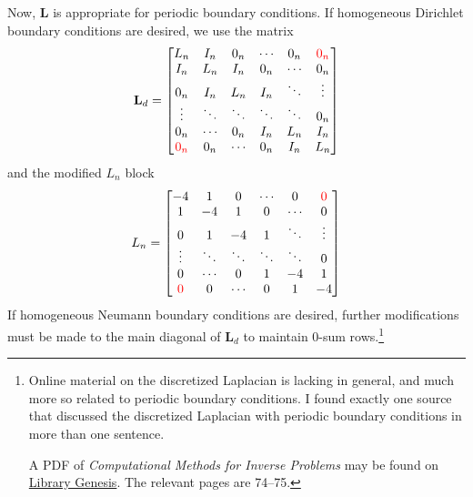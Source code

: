 Now, $\mathbf L$ is appropriate for periodic boundary conditions.
If homogeneous Dirichlet boundary conditions are desired, we use the matrix
\begin{equation}
    \mathbf L_d = \begin{bmatrix}
        L_n              & I_n    & 0_n    & \cdots & 0_n    & \color{red}{0_n} \\
        I_n              & L_n    & I_n    & 0_n    & \cdots & 0_n              \\
        0_n              & I_n    & L_n    & I_n    & \ddots & \vdots           \\
        \vdots           & \ddots & \ddots & \ddots & \ddots & 0_n              \\
        0_n              & \cdots & 0_n    & I_n    & L_n    & I_n              \\
        \color{red}{0_n} & 0_n    & \cdots & 0_n    & I_n    & L_n
    \end{bmatrix}
\end{equation}
and the modified $L_n$ block
\begin{equation}
    L_n = \begin{bmatrix}
        -4             & 1      & 0      & \cdots & 0      & \color{red}{0} \\
        1              & -4     & 1      & 0      & \cdots & 0              \\
        0              & 1      & -4     & 1      & \ddots & \vdots         \\
        \vdots         & \ddots & \ddots & \ddots & \ddots & 0              \\
        0              & \cdots & 0      & 1      & -4     & 1              \\
        \color{red}{0} & 0      & \cdots & 0      & 1      & -4
    \end{bmatrix}
\end{equation}
If homogeneous Neumann boundary conditions are desired, further modifications must be made to the main diagonal of $\mathbf L_d$ to maintain 0-sum rows.\footnote{
    Online material on the discretized Laplacian is lacking in general, and much more so related to periodic boundary conditions.
    I found exactly one source that discussed the discretized Laplacian with periodic boundary conditions in more than one sentence.

    A PDF of \textit{Computational Methods for Inverse Problems} may be found on \href{http://booksdescr.org/item/index.php?md5=6DF2AA596DDBE34BCF9354A5626B75DA}{Library Genesis}.
    The relevant pages are 74--75.
}

